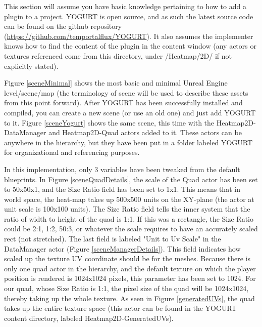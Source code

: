 \documentclass[journal]{IEEEtran}
\begin{document}
This section will assume you have basic knowledge pertaining to how to add a plugin to a project. YOGURT is open source, and as such the latest source code can be found on the github repository (\url{https://github.com/temportalflux/YOGURT}). It also assumes the implementer knows how to find the content of the plugin in the content window (any actors or textures referenced come from this directory, under /Heatmap/2D/ if not explicitly stated).

Figure \ref{sceneMinimal} shows the most basic and minimal Unreal Engine level/scene/map (the terminology of scene will be used to describe these assets from this point forward). After YOGURT has been successfully installed and compiled, you can create a new scene (or use an old one) and just add YOGURT to it. Figure \ref{sceneYogurt} shows the same scene, this time with the Heatmap2D-DataManager and Heatmap2D-Quad actors added to it. These actors can be anywhere in the hierarchy, but they have been put in a folder labeled YOGURT for organizational and referencing purposes.

In this implementation, only 3 variables have been tweaked from the default blueprints. In Figure \ref{sceneQuadDetails}, the scale of the Quad actor has been set to 50x50x1, and the Size Ratio field has been set to 1x1. This means that in world space, the heat-map takes up 500x500 units on the XY-plane (the actor at unit scale is 100x100 units). The Size Ratio field tells the inner system that the ratio of width to height of the quad is 1:1. If this was a rectangle, the Size Ratio could be 2:1, 1:2, 50:3, or whatever the scale requires to have an accurately scaled rect (not stretched). The last field is labeled "Unit to Uv Scale" in the DataManager actor (Figure \ref{sceneManagerDetails}). This field indicates how scaled up the texture UV coordinate should be for the meshes. Because there is only one quad actor in the hierarchy, and the default texture on which the player position is rendered is 1024x1024 pixels, this parameter has been set to 1024. For our quad, whose Size Ratio is 1:1, the pixel size of the quad will be 1024x1024, thereby taking up the whole texture. As seen in Figure \ref{generatedUVs}, the quad takes up the entire texture space (this actor can be found in the YOGURT content directory, labeled Heatmap2D-GeneratedUVs).
\end{document}
